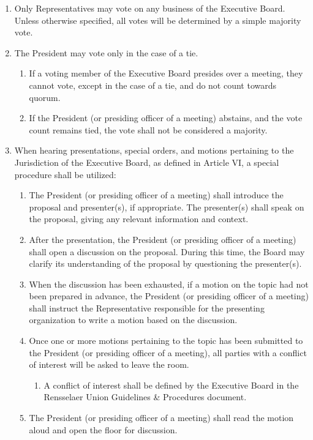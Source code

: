 \documentclass{uniondoc}
\begin{document}

\begin{enumerate}
\item Only Representatives may vote on any business of the Executive Board. Unless otherwise specified, all votes will be determined by a simple majority vote.
\item The President may vote only in the case of a tie.
  \begin{enumerate}
  \item If a voting member of the Executive Board presides over a meeting, they cannot vote, except in the case of a tie, and do not count towards quorum.
  \item If the President (or presiding officer of a meeting) abstains, and the vote count remains tied, the vote shall not be considered a majority.
  \end{enumerate}
\item When hearing presentations, special orders, and motions pertaining to the Jurisdiction of the Executive Board, as defined in Article VI, a special procedure shall be utilized:
  \begin{enumerate}
  \item The President (or presiding officer of a meeting) shall introduce the proposal and presenter(s), if appropriate. The presenter(s) shall speak on the proposal, giving any relevant information and context.
  \item After the presentation, the President (or presiding officer of a meeting) shall open a discussion on the proposal. During this time, the Board may clarify its understanding of the proposal by questioning the presenter(s).
  \item When the discussion has been exhausted, if a motion on the topic had not been prepared in advance, the President (or presiding officer of a meeting) shall instruct the Representative responsible for the presenting organization to write a motion based on the discussion.
  \item Once one or more motions pertaining to the topic has been submitted to the President (or presiding officer of a meeting), all parties with a conflict of interest will be asked to leave the room.
    \begin{enumerate}
    \item A conflict of interest shall be defined by the Executive Board in the Rensselaer Union Guidelines \& Procedures document.
    \end{enumerate}
  \item The President (or presiding officer of a meeting) shall read the motion aloud and open the floor for discussion.

\end{enumerate}
\end{enumerate}
\end{document}
